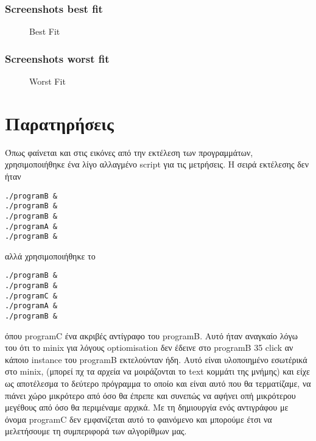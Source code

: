 \documentclass[a4paper]{article}
\begin{document}
\subsubsection{Screenshots best fit}
\begin{figure}[ht]
\centering
\subfigure[Αρχικά]{%
	\texttt{[image: bf1]}
	\label{fig:subfigure1}}
\quad
{}
\quad
{}


\caption{Best Fit}
\label{fig:figure}
\end{figure}
\newpage
\subsubsection{Screenshots worst fit}
\begin{figure}[ht]
\centering
\subfigure[Αρχικά]{%
	\texttt{[image: wf1]}
	\label{fig:subfigure1}}
\quad
{}
\quad
{}


\caption{Worst Fit}
\label{fig:figure}
\end{figure}
\newpage
\section{Παρατηρήσεις}
Όπως φαίνεται και στις εικόνες από την εκτέλεση των προγραμμάτων, χρησιμοποιήθηκε ένα λίγο αλλαγμένο script για τις μετρήσεις.
Η σειρά εκτέλεσης δεν ήταν 

\begin{verbatim}
./programB &
./programB &
./programB &
./programA &
./programB &
\end{verbatim}

αλλά χρησιμοποιήθηκε το 

\begin{verbatim}
./programB &
./programB &
./programC &
./programA &
./programB &
\end{verbatim}


όπου programC ένα ακριβές αντίγραφο του programB. Αυτό ήταν αναγκαίο λόγω του ότι το minix για λόγους optiomisation δεν έδεινε στο programB 35 click αν κάποιο instance του
programB εκτελούνταν ήδη. Αυτό είναι υλοποιημένο εσωτέρικά στο minix, (μπορεί πχ τα αρχεία να μοιράζονται το text κομμάτι της μνήμης) και είχε ως αποτέλεσμα το δεύτερο πρόγραμμα
το οποίο και είναι αυτό που θα τερματίζαμε, να πιάνει χώρο μικρότερο από όσο θα έπρεπε και συνεπώς να αφήνει οπή μικρότερου μεγέθους από όσο θα περιμέναμε αρχικά.
Με τη δημιουργία ενός αντιγράφου με όνομα programC δεν εμφανίζεται αυτό το φαινόμενο και μπορούμε έτσι να μελετήσουμε τη συμπεριφορά των αλγορίθμων μας.
\end{document}
